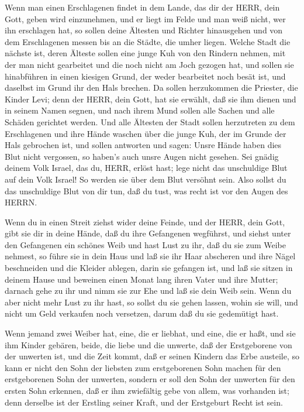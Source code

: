  Wenn man einen Erschlagenen findet in dem Lande, das dir
der HERR, dein Gott, geben wird einzunehmen, und er liegt im Felde und
man weiß nicht, wer ihn erschlagen hat,  so sollen deine
Ältesten und Richter hinausgehen und von dem Erschlagenen messen bis an
die Städte, die umher liegen.  Welche Stadt die nächste ist,
deren Älteste sollen eine junge Kuh von den Rindern nehmen, mit der man
nicht gearbeitet und die noch nicht am Joch gezogen hat, 
und sollen sie hinabführen in einen kiesigen Grund, der weder bearbeitet
noch besät ist, und daselbst im Grund ihr den Hals brechen. 
Da sollen herzukommen die Priester, die Kinder Levi; denn der HERR, dein
Gott, hat sie erwählt, daß sie ihm dienen und in seinem Namen segnen,
und nach ihrem Mund sollen alle Sachen und alle Schäden gerichtet
werden.  Und alle Ältesten der Stadt sollen herzutreten zu
dem Erschlagenen und ihre Hände waschen über die junge Kuh, der im
Grunde der Hals gebrochen ist,  und sollen antworten und
sagen: Unsre Hände haben dies Blut nicht vergossen, so haben's auch
unsre Augen nicht gesehen.  Sei gnädig deinem Volk Israel,
das du, HERR, erlöst hast; lege nicht das unschuldige Blut auf dein Volk
Israel! So werden sie über dem Blut versöhnt sein.  Also
sollst du das unschuldige Blut von dir tun, daß du tust, was recht ist
vor den Augen des HERRN.

 Wenn du in einen Streit ziehst wider deine Feinde, und der
HERR, dein Gott, gibt sie dir in deine Hände, daß du ihre Gefangenen
wegführst,  und siehst unter den Gefangenen ein schönes
Weib und hast Lust zu ihr, daß du sie zum Weibe nehmest, 
so führe sie in dein Haus und laß sie ihr Haar abscheren und ihre Nägel
beschneiden  und die Kleider ablegen, darin sie gefangen
ist, und laß sie sitzen in deinem Hause und beweinen einen Monat lang
ihren Vater und ihre Mutter; darnach gehe zu ihr und nimm sie zur Ehe
und laß sie dein Weib sein.  Wenn du aber nicht mehr Lust
zu ihr hast, so sollst du sie gehen lassen, wohin sie will, und nicht um
Geld verkaufen noch versetzen, darum daß du sie gedemütigt hast.

 Wenn jemand zwei Weiber hat, eine, die er liebhat, und
eine, die er haßt, und sie ihm Kinder gebären, beide, die liebe und die
unwerte, daß der Erstgeborene von der unwerten ist,  und
die Zeit kommt, daß er seinen Kindern das Erbe austeile, so kann er
nicht den Sohn der liebsten zum erstgeborenen Sohn machen für den
erstgeborenen Sohn der unwerten,  sondern er soll den Sohn
der unwerten für den ersten Sohn erkennen, daß er ihm zwiefältig gebe
von allem, was vorhanden ist; denn derselbe ist der Erstling seiner
Kraft, und der Erstgeburt Recht ist sein.


